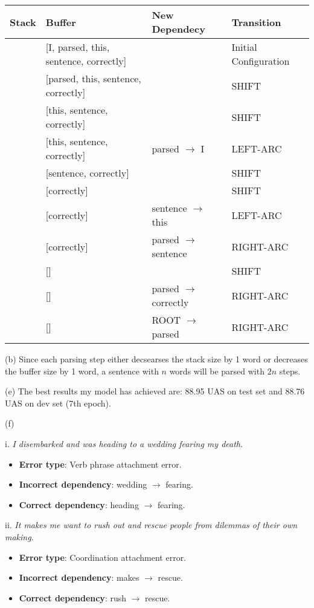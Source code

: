 \documentclass[12pt]{article}
\begin{document}
\noindent
\begin{tabular}{ p{10em} | p{10em} | p{5em} | p{5em} }
Stack & Buffer & New Dependecy & Transition \\
\hline
[ROOT] & [I, parsed, this, sentence, correctly] & & Initial Configuration \\
\hline
[ROOT, I] & [parsed, this, sentence, correctly] & & SHIFT \\
\hline
[ROOT, I, parsed] & [this, sentence, correctly] & & SHIFT \\
\hline
[ROOT, parsed] & [this, sentence, correctly] & parsed $\to$ I & LEFT-ARC \\
\hline
[ROOT, parsed, this] & [sentence, correctly] & & SHIFT \\
\hline
[ROOT, parsed, this, sentence] & [correctly] & & SHIFT \\
\hline
[ROOT, parsed, sentence] & [correctly] & sentence $\to$ this & LEFT-ARC \\
\hline
[ROOT, parsed] & [correctly] & parsed $\to$ sentence & RIGHT-ARC \\
\hline
[ROOT, parsed, correctly] & [] & & SHIFT \\
\hline
[ROOT, parsed] & [] & parsed $\to$ correctly & RIGHT-ARC \\
\hline
[ROOT] & [] & ROOT $\to$ parsed & RIGHT-ARC \\
\hline
\end{tabular}
\medskip

\noindent(b) Since each parsing step either decsearses the stack size by 1 word or decreases the buffer size by 1 word, a sentence with $n$ words will be parsed with $2n$ steps.
\medskip

\noindent(e) The best results my model has achieved are: 88.95 UAS on test set and 88.76 UAS on dev set (7th epoch).
\medskip

\noindent(f)

i. \textit{I disembarked and was heading to a wedding fearing my death}.
\begin{itemize}
\item \textbf{Error type}: Verb phrase attachment error.
\item \textbf{Incorrect dependency}: wedding $\to$ fearing.
\item \textbf{Correct dependency}: heading $\to$ fearing.
\end{itemize}

ii. \textit{It makes me want to rush out and rescue people from dilemmas of their own making}.
\begin{itemize}
\item \textbf{Error type}: Coordination attachment error.
\item \textbf{Incorrect dependency}: makes $\to$ rescue.
\item \textbf{Correct dependency}: rush $\to$ rescue.
\end{itemize}
\end{document}
